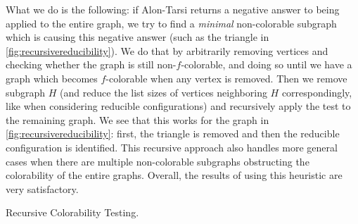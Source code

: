 What we do is the following: if Alon-Tarsi returns a negative answer to being applied to the 
entire graph, we try to find a \emph{minimal} non-colorable subgraph which is causing this 
negative answer (such 
as the triangle in \ref{fig:recursivereducibility}). We do that by arbitrarily removing vertices
and checking whether the graph is still non-$f$-colorable, and doing so until we have a graph
which becomes $f$-colorable when any vertex is removed. Then we remove subgraph $H$ (and reduce
the list sizes of vertices neighboring $H$ correspondingly, like when considering reducible 
configurations) and recursively apply the test to the remaining graph. We see that this works for
the graph in \ref{fig:recursivereducibility}: first, the triangle is removed and then the 
reducible configuration is identified. This recursive approach also handles more general cases
when there are multiple non-colorable subgraphs obstructing the colorability of the entire graphs.
Overall, the results of using this heuristic are very satisfactory. 

\begin{algorithm}[H]
\caption{Recursive Colorability Testing.}
\SetAlgoLined
{}


\end{algorithm}

